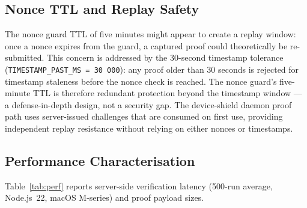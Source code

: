 \documentclass[conference]{IEEEtran}
\begin{document}
\subsection{Nonce TTL and Replay Safety}

The nonce guard TTL of five minutes might appear to create a replay window: once a nonce expires from the guard, a captured proof could theoretically be re-submitted. This concern is addressed by the 30-second timestamp tolerance (\texttt{TIMESTAMP\_PAST\_MS = 30\,000}): any proof older than 30 seconds is rejected for timestamp staleness before the nonce check is reached. The nonce guard's five-minute TTL is therefore redundant protection beyond the timestamp window — a defense-in-depth design, not a security gap. The device-shield daemon proof path uses server-issued challenges that are consumed on first use, providing independent replay resistance without relying on either nonces or timestamps.

\subsection{Performance Characterisation}

Table~\ref{tab:perf} reports server-side verification latency (500-run average, Node.js~22, macOS M-series) and proof payload sizes.

\begin{table}[t]
\centering
\small
\caption{Server-Side Latency and Payload Sizes}
\label{tab:perf}
\end{table}
\end{document}
